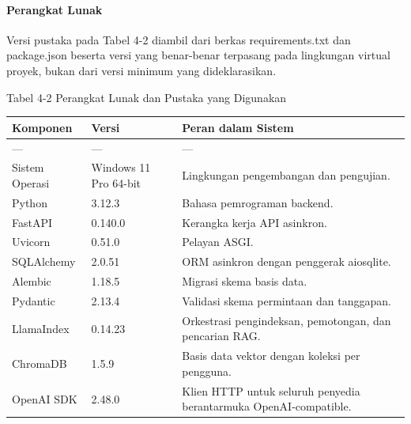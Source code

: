 \documentclass[12pt,a4paper]{article}
\begin{document}
\paragraph*{Perangkat Lunak}

Versi pustaka pada Tabel 4-2 diambil dari berkas requirements.txt dan package.json beserta versi yang benar-benar terpasang pada lingkungan virtual proyek, bukan dari versi minimum yang dideklarasikan.



Tabel 4-2	Perangkat Lunak dan Pustaka yang Digunakan



\begin{table}[h]

\centering

\begin{tabular}{lll}

\toprule

Komponen & Versi & Peran dalam Sistem \\

\midrule

--- & --- & --- \\

Sistem Operasi & Windows 11 Pro 64-bit & Lingkungan pengembangan dan pengujian. \\

Python & 3.12.3 & Bahasa pemrograman backend. \\

FastAPI & 0.140.0 & Kerangka kerja API asinkron. \\

Uvicorn & 0.51.0 & Pelayan ASGI. \\

SQLAlchemy & 2.0.51 & ORM asinkron dengan penggerak aiosqlite. \\

Alembic & 1.18.5 & Migrasi skema basis data. \\

Pydantic & 2.13.4 & Validasi skema permintaan dan tanggapan. \\

LlamaIndex & 0.14.23 & Orkestrasi pengindeksan, pemotongan, dan pencarian RAG. \\

ChromaDB & 1.5.9 & Basis data vektor dengan koleksi per pengguna. \\

OpenAI SDK & 2.48.0 & Klien HTTP untuk seluruh penyedia berantarmuka OpenAI-compatible. \\


\end{tabular}
\end{table}
\end{document}
